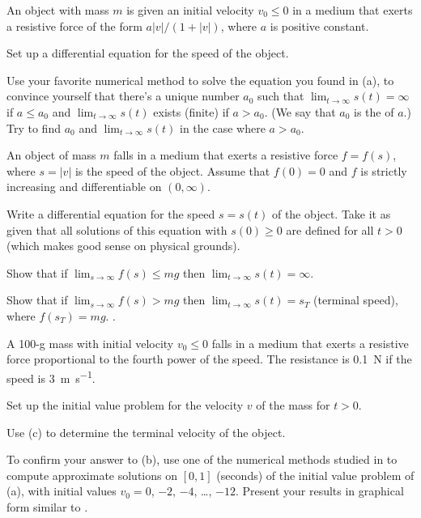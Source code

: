 \begin{exerciselist}
\item\label{exer:4.3.13}\Lex
An object with mass $m$ is given an  initial velocity $v_0\le0$
in a medium that exerts a resistive force of the form
 $a|v|/(1+|v|)$, where  $a$ is positive constant.

\begin{alist}
\item %
Set up a differential equation for the speed of the object.
\item %
Use your favorite numerical method to solve the equation you found in
(a), to convince yourself that there's  a unique number $a_0$ such
that $\lim_{t\to\infty}s(t)=\infty$ if $a\le a_0$ and
$\lim_{t\to\infty}s(t)$ exists (finite) if $a>a_0$. (We say that $a_0$
is the  of $a$.) Try to find $a_0$ and
$\lim_{t\to\infty}s(t)$ in the case where $a>a_0$.
\end{alist}

\item\label{exer:4.3.14}An object of mass $m$ falls in a medium that exerts a resistive force
$f=f(s)$, where $s=|v|$ is the speed of the object. Assume that
$f(0)=0$ and $f$ is strictly increasing and differentiable on
$(0,\infty)$.
\begin{alist}
\item %
Write a differential equation for the speed $s=s(t)$ of the object.
Take it as given that all solutions of this equation with $s(0)\ge0$
are defined for all $t>0$ (which makes good sense on physical
grounds).
\item %
Show that if $\lim_{s\to\infty}f(s)\le mg$ then
$\lim_{t\to\infty}s(t)=\infty$.
\item %
Show that if $\lim_{s\to\infty}f(s)>mg$ then
$\lim_{t\to\infty}s(t)=s_T$ (terminal speed), where $f(s_T)=mg$.
.
\end{alist}

\item\label{exer:4.3.15}A 100-g mass with initial velocity $v_0\le0$ falls in a medium that
exerts a resistive force proportional to the fourth power of the
speed. The resistance is \qty{.1}{\newton} if the speed is \qty{3}{\meter\per\second}.

\begin{alist}
\item %
Set up the initial value problem for the velocity $v$ of the mass for
$t>0$.
\item %
Use (c) to determine the terminal velocity of
the object.
\item %
\Cex
To confirm your answer to (b),  use one of the numerical methods  studied
in  to compute  approximate solutions on $[0,1]$
(seconds) of the initial value problem of (a), with initial values
$v_0=0$, $-2$, $-4$, \dots, $-12$. Present your results in graphical form
similar to .
\end{alist}


\end{exerciselist}

